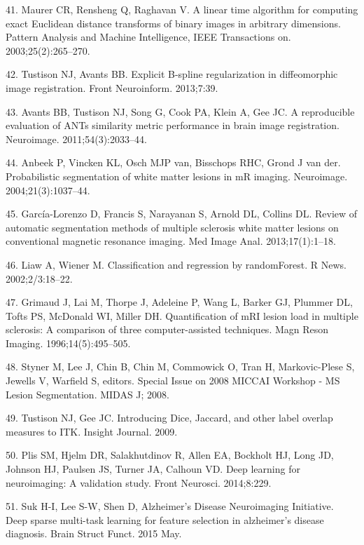 \documentclass[11pt,]{article}
\begin{document}
\hypertarget{ref-maurer2003}{}
41. Maurer CR, Rensheng Q, Raghavan V. A linear time algorithm for
computing exact Euclidean distance transforms of binary images in
arbitrary dimensions. Pattern Analysis and Machine Intelligence, IEEE
Transactions on. 2003;25(2):265--270.

\hypertarget{ref-Tustison:2013ac}{}
42. Tustison NJ, Avants BB. Explicit B-spline regularization in
diffeomorphic image registration. Front Neuroinform. 2013;7:39.

\hypertarget{ref-Avants:2011ab}{}
43. Avants BB, Tustison NJ, Song G, Cook PA, Klein A, Gee JC. A
reproducible evaluation of ANTs similarity metric performance in brain
image registration. Neuroimage. 2011;54(3):2033--44.

\hypertarget{ref-Anbeek:2004aa}{}
44. Anbeek P, Vincken KL, Osch MJP van, Bisschops RHC, Grond J van der.
Probabilistic segmentation of white matter lesions in mR imaging.
Neuroimage. 2004;21(3):1037--44.

\hypertarget{ref-Garcia-Lorenzo:2013aa}{}
45. García-Lorenzo D, Francis S, Narayanan S, Arnold DL, Collins DL.
Review of automatic segmentation methods of multiple sclerosis white
matter lesions on conventional magnetic resonance imaging. Med Image
Anal. 2013;17(1):1--18.

\hypertarget{ref-liaw2002}{}
46. Liaw A, Wiener M. Classification and regression by randomForest. R
News. 2002;2/3:18--22.

\hypertarget{ref-Grimaud:1996aa}{}
47. Grimaud J, Lai M, Thorpe J, Adeleine P, Wang L, Barker GJ, Plummer
DL, Tofts PS, McDonald WI, Miller DH. Quantification of mRI lesion load
in multiple sclerosis: A comparison of three computer-assisted
techniques. Magn Reson Imaging. 1996;14(5):495--505.

\hypertarget{ref-styner2008}{}
48. Styner M, Lee J, Chin B, Chin M, Commowick O, Tran H, Markovic-Plese
S, Jewells V, Warfield S, editors. Special Issue on 2008 MICCAI Workshop
- MS Lesion Segmentation. MIDAS J; 2008.

\hypertarget{ref-tustison2009}{}
49. Tustison NJ, Gee JC. Introducing Dice, Jaccard, and other label
overlap measures to ITK. Insight Journal. 2009.

\hypertarget{ref-Plis:2014aa}{}
50. Plis SM, Hjelm DR, Salakhutdinov R, Allen EA, Bockholt HJ, Long JD,
Johnson HJ, Paulsen JS, Turner JA, Calhoun VD. Deep learning for
neuroimaging: A validation study. Front Neurosci. 2014;8:229.

\hypertarget{ref-Suk:2015aa}{}
51. Suk H-I, Lee S-W, Shen D, Alzheimer's Disease Neuroimaging
Initiative. Deep sparse multi-task learning for feature selection in
alzheimer's disease diagnosis. Brain Struct Funct. 2015 May.
\end{document}
